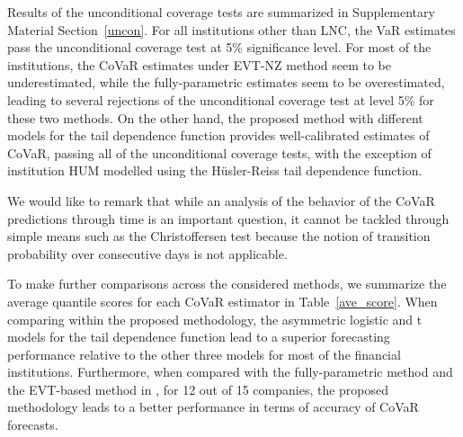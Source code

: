 \documentclass[11pt,letterpaper]{article}
\numberwithin{equation}{section}
\begin{document}
Results of the unconditional coverage tests are summarized in Supplementary Material Section~\ref{uncon}. For all institutions other than LNC, the VaR estimates pass the unconditional coverage test at 5\% significance level. For most of the institutions, the CoVaR estimates under EVT-NZ method seem to be underestimated, while the fully-parametric estimates seem to be overestimated, leading to several rejections of the unconditional coverage test at level 5\% for these two methods. On the other hand, the proposed method with different models for the tail dependence function provides well-calibrated estimates of CoVaR, passing all of the unconditional coverage tests, with the exception of institution HUM modelled using the H\"usler-Reiss tail dependence function.

We would like to remark that while an analysis of the behavior of the CoVaR predictions through time is an important question, it cannot be tackled through simple means such as the Christoffersen test because the notion of transition probability over consecutive days is not applicable.

To make further comparisons across the considered methods, we summarize the average quantile scores for each CoVaR estimator in Table~\ref{ave_score}. When comparing within the proposed methodology, the asymmetric logistic and t models for the tail dependence function lead to a superior forecasting performance relative to the other three models for most of the financial institutions. Furthermore, when compared with the fully-parametric method and the EVT-based method in \cite{NoldeZhang2018}, for 12 out of 15 companies, the proposed methodology leads to a better performance in terms of accuracy of CoVaR forecasts. 
\end{document}
